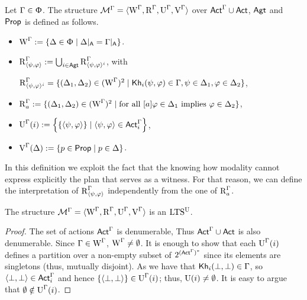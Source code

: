 \medskip

\begin{definition}\label{def:cm-ults-khiml}
Let $\Gamma \in \Upphi$. The structure $\mathcal{M}^\Gamma=\langle \operatorname{W}^\Gamma, \operatorname{R}^\Gamma, \operatorname{U}^\Gamma, \operatorname{V}^\Gamma \rangle$ over ${\rm \sf Act}^\Gamma \cup {\rm \sf Act}$, ${\rm \sf Agt}$ and ${\rm \sf Prop}$ is defined as follows.
\begin{itemize}
\item $\operatorname{W}^\Gamma := \{ \Delta \in \Upphi \mid \Delta\vert_{{\sf A}} = \Gamma\vert_{{\sf A}} \}$.

\item $\operatorname{R}^{\Gamma}_{\langle \psi,\varphi \rangle} := \bigcup_{i \in {\rm \sf Agt}} \operatorname{R}^{\Gamma} _{\langle \psi,\varphi \rangle^i}$, with
\begin{center}
$\operatorname{R}^{\Gamma}_{\langle \psi,\varphi \rangle^i} = \{ (\Delta_1, \Delta_2) \in (\operatorname{W}^\Gamma)^2 \mid {\sf Kh}_i(\psi,\varphi) \in \Gamma, \psi \in \Delta_1, \varphi \in \Delta_2 \}$,
\end{center}

\item $\operatorname{R}^{\Gamma}_a := \{ (\Delta_1, \Delta_2) \in (\operatorname{W}^\Gamma)^2 \mid \text{for all } [a]\varphi \in \Delta_1 \text{ implies } \varphi \in \Delta_2 \}$,

\item $\operatorname{U}^\Gamma(i) := \left\{ \{ \langle \psi,\varphi \rangle \} \mid \langle \psi,\varphi \rangle \in {\rm \sf Act}^\Gamma_i \right\}$,

\item $\operatorname{V}^\Gamma(\Delta) := \{ p \in {\rm \sf Prop} \mid p \in \Delta \}$.
\end{itemize}
\end{definition}

\medskip
In this definition we exploit the fact that the knowing how modality cannot express explicitly the plan that serves as a witness.  For that reason, we can define the 
interpretation of $\operatorname{R}^{\Gamma}_{\langle \psi,\varphi \rangle}$ independently from the one of
$\operatorname{R}^{\Gamma}_a$.
\medskip


\begin{proposition}\label{pro:cm-ults-khiml}
The structure $\mathcal{M}^\Gamma = \langle \operatorname{W}^\Gamma, \operatorname{R}^\Gamma, \operatorname{U}^\Gamma, \operatorname{V}^\Gamma \rangle$ is an $\textup{LTS$^\text{\textup{U}}$}$.
\end{proposition}
\begin{proof}
The set of actions ${\rm \sf Act}^\Gamma$ is denumerable, Thus ${\rm \sf Act}^\Gamma\cup{\rm \sf Act}$ is also denumerable.
Since $\Gamma \in \operatorname{W}^\Gamma$, $\operatorname{W}^\Gamma \neq \emptyset$.
It is enough to show that each $\operatorname{U}^\Gamma(i)$ defines a partition over a non-empty subset of $2^{({\rm \sf Act}^\Gamma)^*}$ since its elements are singletons (thus, mutually disjoint).
As we have that ${\sf Kh}_i(\bot,\bot) \in \Gamma$, so $\langle \bot, \bot \rangle \in {\rm \sf Act}^\Gamma_i$ and hence $\{ \langle \bot, \bot \rangle \} \in \operatorname{U}^\Gamma(i)$; thus, $\operatorname{U}(i) \neq \emptyset$.
It is easy to argue that $\emptyset \notin \operatorname{U}^\Gamma(i)$.
\end{proof}



